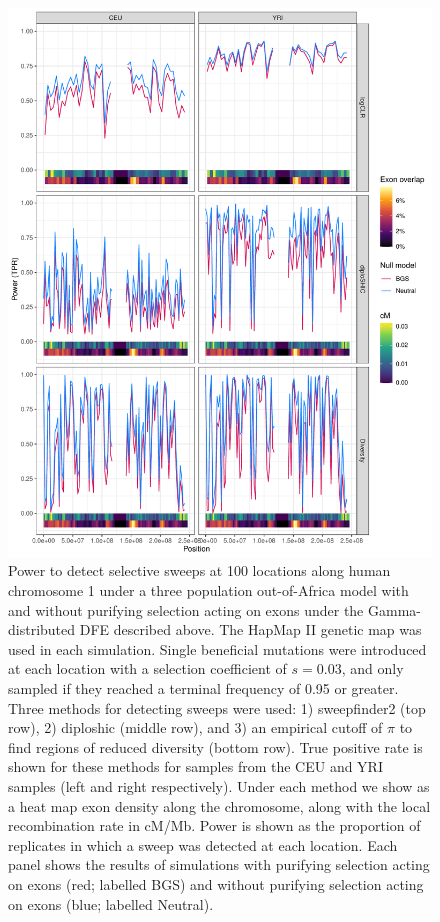 \documentclass[hidelinks]{article}
\begin{document}
    \begin{figure}
        \centering
        \includegraphics[width=0.8 \textwidth]{figures/sweeps/chr1_power.pdf}
        \caption{
        Power to detect selective sweeps at 100 locations along human chromosome 1 under a three population out-of-Africa model \citep{gutenkunst2009inferring}  
        with and without purifying selection acting on exons under the Gamma-distributed DFE described above. 
        The HapMap II genetic map \citep{international2007second} was used in each simulation. 
        Single beneficial mutations were introduced at each location with a selection coefficient of $s = 0.03$,
        and only sampled if they reached a terminal frequency of 0.95 or greater. 
        Three methods for detecting sweeps were used: 1) sweepfinder2 \citep{degiorgio2016sweepfinder2} (top row), 
        2) diploshic \citep{kern2018diplos} (middle row), and 3) an empirical cutoff of $\pi$ to find regions of reduced diversity (bottom row).
        True positive rate is shown for these methods for samples from the CEU and YRI samples (left and right respectively). 
        Under each method we show as a heat map exon density along the chromosome, along with the local recombination rate in cM/Mb.
        Power is shown as the proportion of replicates in which a sweep was detected at each location. 
        Each panel shows the results of simulations with purifying selection acting on exons (red; labelled BGS)
        and without purifying selection acting on exons (blue; labelled Neutral).
        }
        \label{fig:chr1_power}
    \end{figure}
    
\end{document}
